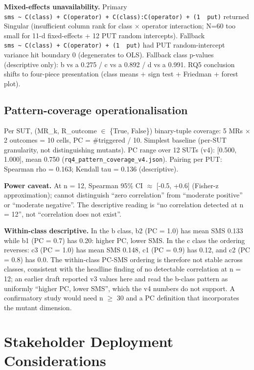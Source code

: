 \documentclass[manuscript,screen,review]{acmart}
\begin{document}
\textbf{Mixed-effects unavailability.} Primary
\texttt{sms\ \textasciitilde{}\ C(class)\ +\ C(operator)\ +\ C(class):C(operator)\ +\ (1\ \textbar{}\ put)}
returned Singular (insufficient column rank for class $\times$ operator
interaction; N=60 too small for 11-d fixed-effects + 12 PUT random
intercepts). Fallback
\texttt{sms\ \textasciitilde{}\ C(class)\ +\ C(operator)\ +\ (1\ \textbar{}\ put)}
had PUT random-intercept variance hit boundary 0 (degenerates to OLS).
Fallback class p-values (descriptive only): b vs a 0.275 / c vs a 0.892
/ d vs a 0.991. RQ5 conclusion shifts to four-piece presentation (class
means + sign test + Friedman + forest plot).

\subsection{Pattern-coverage operationalisation}\label{d.5-pattern-coverage-operationalisation}

Per SUT, (MR\_k, R\_outcome $\in$ \{True, False\}) binary-tuple coverage: 5
MRs $\times$ 2 outcomes = 10 cells, PC = \#triggered / 10. Simplest baseline
(per-SUT granularity, not distinguishing mutants). PC range over 12
SUTs (v4): {[}0.500, 1.000{]}, mean 0.750
(\texttt{rq4\_pattern\_coverage\_v4.json}).
Pairing per PUT: Spearman rho = 0.163; Kendall tau = 0.136
(descriptive).

\textbf{Power caveat.} At n = 12, Spearman 95\% CI $\approx$ {[}-0.5, +0.6{]}
(Fisher-z approximation); cannot distinguish ``zero correlation'' from ``moderate positive'' or
``moderate negative''. The descriptive reading is ``no correlation detected
at n = 12'', not ``correlation does not exist''.

\textbf{Within-class descriptive.} In the b class, b2 (PC = 1.0) has
mean SMS 0.133 while b1 (PC = 0.7) has 0.20: higher PC, lower SMS. In
the c class the ordering reverses: c3 (PC = 1.0) has mean SMS 0.148,
c1 (PC = 0.9) has 0.12, and c2 (PC = 0.8) has 0.0. The within-class
PC-SMS ordering is therefore not stable across classes, consistent with
the headline finding of no detectable correlation at n = 12; an earlier
draft reported v3 values here and read the b-class pattern as
uniformly ``higher PC, lower SMS'', which the v4 numbers do not
support. A confirmatory study would need n $\geq$ 30 and a PC
definition that incorporates the mutant dimension.


\section{Stakeholder Deployment Considerations}\label{e.-stakeholder-deployment-considerations-single-output-kernels-scope}
\end{document}
